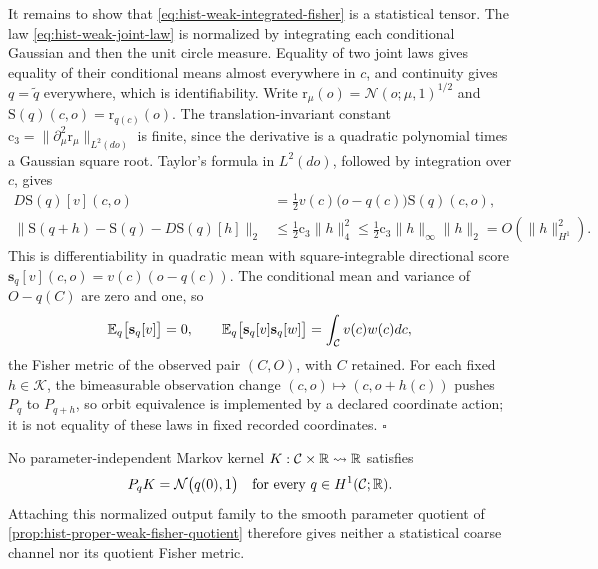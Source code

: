 It remains to show that \eqref{eq:hist-weak-integrated-fisher} is a
statistical tensor. The law \eqref{eq:hist-weak-joint-law} is normalized by
integrating each conditional Gaussian and then the unit circle measure.
Equality of two joint laws gives equality of their conditional means almost
everywhere in \(c\), and continuity gives \(q=\widetilde q\) everywhere, which
is identifiability. Write \(\mathrm r_\mu(o)=\mathcal N(o;\mu,1)^{1/2}\) and
\(\mathrm S(q)(c,o)=\mathrm r_{q(c)}(o)\). The translation-invariant constant
\(\mathrm c_3=\|\partial_\mu^2\mathrm r_\mu\|_{L^2(do)}\) is finite, since the
derivative is a quadratic polynomial times a Gaussian square root. Taylor's
formula in \(L^2(do)\), followed by integration over \(c\), gives
\begin{equation}
\begin{split}
D\mathrm S(q)[v](c,o)&=\tfrac12v(c)\bigl(o-q(c)\bigr)\mathrm S(q)(c,o),\\
\|\mathrm S(q+h)-\mathrm S(q)-D\mathrm S(q)[h]\|_2
&\leq\tfrac12\mathrm c_3\|h\|_4^2
\leq\tfrac12\mathrm c_3\|h\|_\infty\|h\|_2
=O(\|h\|_{H^1}^2).
\end{split}
\label{eq:hist-weak-fisher-dqm}
\end{equation}
This is differentiability in quadratic mean with square-integrable directional
score \(\mathbf s_q[v](c,o)=v(c)(o-q(c))\). The conditional mean and variance
of \(O-q(C)\) are zero and one, so
\begin{equation}
\mathbb E_q\bigl[\mathbf s_q[v]\bigr]=0,
\qquad
\mathbb E_q\bigl[\mathbf s_q[v]\mathbf s_q[w]\bigr]
=\int_{\mathcal C}v(c)w(c)dc,
\label{eq:hist-weak-fisher-score}
\end{equation}
the Fisher metric of the observed pair \((C,O)\), with \(C\) retained. For each
fixed \(h\in\mathcal K\), the bimeasurable observation change
\((c,o)\mapsto(c,o+h(c))\) pushes \(P_q\) to \(P_{q+h}\), so orbit equivalence
is implemented by a declared coordinate action; it is not equality of these
laws in fixed recorded coordinates. \(\square\)

No parameter-independent Markov kernel \(K:\mathcal C\times\mathbb R\rightsquigarrow\mathbb R\)
satisfies
\begin{equation}
P_qK=\mathcal N\bigl(q(0),1\bigr)
\quad\text{for every }q\in H^1(\mathcal C;\mathbb R).
\label{eq:hist-trace-channel-impossibility}
\end{equation}
Attaching this normalized output family to the smooth parameter quotient of
\cref{prop:hist-proper-weak-fisher-quotient} therefore gives neither a
statistical coarse channel nor its quotient Fisher metric. 

